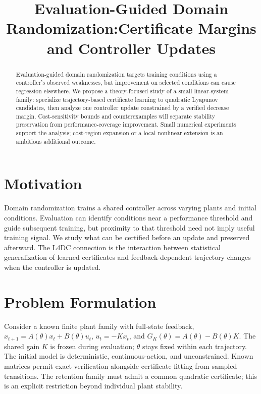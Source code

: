 \documentclass{l4dc2026}
\title[Evaluation-Guided Domain Randomization]{Evaluation-Guided Domain Randomization:\newline Certificate Margins and Controller Updates}
\author{%
 \Name{Shimin Chen} \Email{cshimin@engineering.upenn.edu}
}
\begin{document}
\maketitle

\begin{abstract}%
Evaluation-guided domain randomization targets training conditions using a
controller's observed weaknesses, but improvement on selected conditions can
cause regression elsewhere. We propose a theory-focused study of a small
linear-system family: specialize trajectory-based certificate learning to
quadratic Lyapunov candidates, then analyze one controller update constrained
by a verified decrease margin. Cost-sensitivity bounds and counterexamples will
separate stability preservation from performance-coverage improvement. Small
numerical experiments support the analysis; cost-region expansion or a local
nonlinear extension is an ambitious additional outcome.%
\end{abstract}

\section{Motivation}

Domain randomization trains a shared controller across varying plants and
initial conditions. Evaluation can identify conditions near a performance
threshold and guide subsequent training, but proximity to that threshold need
not imply useful training signal. We study what can be certified before an
update and preserved afterward. The L4DC connection is the interaction between
statistical generalization of learned certificates and feedback-dependent
trajectory changes when the controller is updated.

\section{Problem Formulation}

Consider a known finite plant family with full-state feedback,
$x_{t+1}=A(\theta)x_t+B(\theta)u_t$, $u_t=-Kx_t$, and
$G_K(\theta)=A(\theta)-B(\theta)K$. The shared gain $K$ is frozen during
evaluation; $\theta$ stays fixed within each trajectory. The initial model is
deterministic, continuous-action, and unconstrained. Known matrices permit
exact verification alongside certificate fitting from sampled transitions.
The retention family must admit a common quadratic certificate; this is an
explicit restriction beyond individual plant stability.
\end{document}
